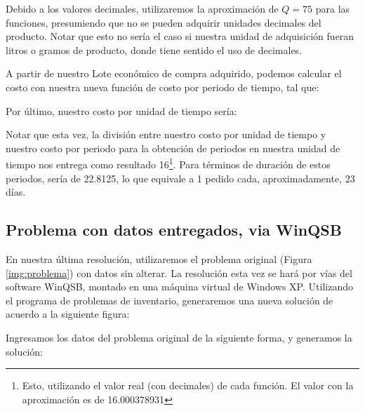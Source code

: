 
Debido a los valores decimales, utilizaremos la aproximación de $Q = 75$ para las funciones, presumiendo que no se pueden adquirir unidades decimales del producto. Notar que esto no sería el caso si nuestra unidad de adquisición fueran litros o gramos de producto, donde tiene sentido el uso de decimales.

A partir de nuestro Lote económico de compra adquirido, podemos calcular el costo con nuestra nueva función de costo por periodo de tiempo, tal que:


Por último, nuestro costo por unidad de tiempo sería:


Notar que esta vez, la división entre nuestro costo por unidad de tiempo y nuestro costo por periodo para la obtención de periodos en nuestra unidad de tiempo nos entrega como resultado 16\footnote{Esto, utilizando el valor real (con decimales) de cada función. El valor con la aproximación es de 16.000378931}. Para términos de duración de estos periodos, sería de 22.8125, lo que equivale a 1 pedido cada, aproximadamente, 23 días.

\subsection{Problema con datos entregados, via WinQSB}
En nuestra última resolución, utilizaremos el problema original (Figura \ref{img:problema}) con datos sin alterar. La resolución esta vez se hará por vías del software WinQSB, montado en una máquina virtual de Windows XP. Utilizando el programa de problemas de inventario, generaremos una nueva solución de acuerdo a la siguiente figura:


Ingresamos los datos del problema original de la siguiente forma, y generamos la solución:

